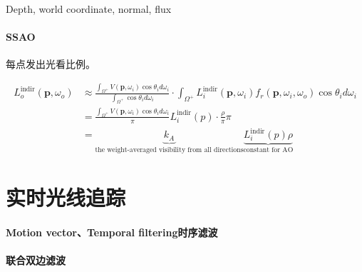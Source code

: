 \documentclass[]{ctexart}
\begin{document}
Depth, world coordinate, normal, flux

\paragraph{SSAO}

每点发出光看比例。

\begin{equation}
    \begin{aligned}
        L_o^\text{indir}(\mathbf{p},\omega_o)&\approx\frac{\int_{\Omega^+}V(\mathbf{p},\omega_i)\cos\theta_i d\omega_i}{\int_{\Omega^+}\cos\theta_i d\omega_i}\cdot\int_{\Omega^+}L_i^\text{indir}(\mathbf{p},\omega_i)f_r(\mathbf{p},\omega_i,\omega_o)\cos\theta_i d\omega_i\\
        &=\frac{\int_{\Omega^+}V(\mathbf{p},\omega_i)\cos\theta_i d\omega_i}{\pi} L_i^\text{indir}(p)\cdot\frac{\rho}{\pi}\pi\\
        &=\underbrace{k_A}_\text{the weight-averaged visibility from all directions} \underbrace{L_i^\text{indir}(p)\rho}_\text{constant for AO}
    \end{aligned}
\end{equation}

\section{实时光线追踪}
\paragraph{Motion vector、Temporal filtering时序滤波}



\paragraph{联合双边滤波}
\end{document}
